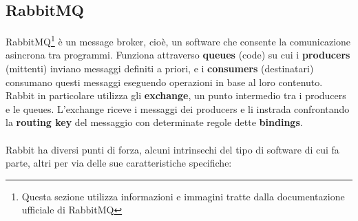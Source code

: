 \subsection{RabbitMQ}
RabbitMQ\footnote{Questa sezione utilizza informazioni e immagini tratte dalla documentazione ufficiale di RabbitMQ\cite{rabbitmq}}
\`e un message broker, cio\`e, un software che consente la comunicazione asincrona tra programmi.
Funziona attraverso \textbf{queues} (code) su cui i \textbf{producers} (mittenti) inviano messaggi definiti a priori,
e i \textbf{consumers} (destinatari) consumano questi messaggi eseguendo operazioni in base al loro contenuto.
Rabbit in particolare utilizza gli \textbf{exchange}, un punto intermedio tra i producers e le queues.
L'exchange riceve i messaggi dei producers e li instrada confrontando la \textbf{routing key} del messaggio con determinate regole dette \textbf{bindings}.
\\\\
Rabbit ha diversi punti di forza, alcuni intrinsechi del tipo di software di cui fa parte, altri per via delle sue caratteristiche specifiche:\
